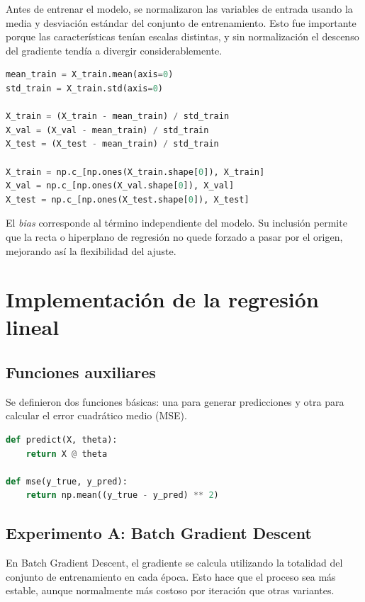 \documentclass[conference]{IEEEtran}
\newcommand{\CodeBlockSpaceBefore}{\vspace{8pt}}
\newcommand{\CodeBlockSpaceAfter}{\vspace{10pt}}
\begin{document}
Antes de entrenar el modelo, se normalizaron las variables de entrada usando la media y desviación estándar del conjunto de entrenamiento. Esto fue importante porque las características tenían escalas distintas, y sin normalización el descenso del gradiente tendía a divergir considerablemente.

\CodeBlockSpaceBefore
\begin{lstlisting}[language=Python, caption={Normalización y agregado del bias}]
mean_train = X_train.mean(axis=0)
std_train = X_train.std(axis=0)

X_train = (X_train - mean_train) / std_train
X_val = (X_val - mean_train) / std_train
X_test = (X_test - mean_train) / std_train

X_train = np.c_[np.ones(X_train.shape[0]), X_train]
X_val = np.c_[np.ones(X_val.shape[0]), X_val]
X_test = np.c_[np.ones(X_test.shape[0]), X_test]
\end{lstlisting}
\CodeBlockSpaceAfter

El \textit{bias} corresponde al término independiente del modelo. Su inclusión permite que la recta o hiperplano de regresión no quede forzado a pasar por el origen, mejorando así la flexibilidad del ajuste.

\section{Implementación de la regresión lineal}

\subsection{Funciones auxiliares}

Se definieron dos funciones básicas: una para generar predicciones y otra para calcular el error cuadrático medio (MSE).

\CodeBlockSpaceBefore
\begin{lstlisting}[language=Python, caption={Funciones auxiliares del modelo}]
def predict(X, theta):
    return X @ theta

def mse(y_true, y_pred):
    return np.mean((y_true - y_pred) ** 2)
\end{lstlisting}
\CodeBlockSpaceAfter

\subsection{Experimento A: Batch Gradient Descent}

En Batch Gradient Descent, el gradiente se calcula utilizando la totalidad del conjunto de entrenamiento en cada época. Esto hace que el proceso sea más estable, aunque normalmente más costoso por iteración que otras variantes.
\end{document}
